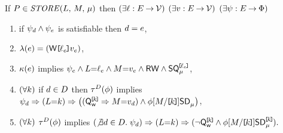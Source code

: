 \noindent
If $\aPS \in \sSTORE[\amode]{\cExp}{\aExp}$ then
$(\exists\cVal:\aEvs\fun\Val)$
$(\exists\aVal:\aEvs\fun\Val)$
$(\exists\bForm:\aEvs\fun\Formulae)$
\begin{enumerate}
\item if $\bForm_\bEv\land\bForm_\aEv$ is satisfiable then $\bEv=\aEv$,
\item $\labelingAct(\aEv) = \DWREFP{\cVal_\aEv}{\aVal_\aEv}$,
\item 
  $\labelingForm(\aEv)$ implies
  \begin{math}
    \bForm_\aEv
    \land \cExp{=}\cVal_\aEv
    \land \aExp{=}\aVal_\aEv
    \land \RW
    \land \QS{\REF{\cVal_\aEv}}{\amode}
  \end{math},
\item
  \begin{math}
    (\forall\dVal)
  \end{math}
  if
  $\bEv\in\bEvs$
  then
  $\aTr[\bEvs](\aForm)$ implies 
  \begin{math}
    \bForm_\bEv
    \limplies (\cExp{=}\dVal)
    \limplies \PBRbig{
      (\QwREF{\dVal} \limplies \aExp{=}\aVal_\bEv)
      \land \aForm[\aExp/\REF{\dVal}] \DS{}{\amode}
    }
  \end{math},
\item %
  \begin{math}
    (\forall\dVal)
  \end{math}
  $\aTr[\bEvs](\aForm)$ implies 
  \begin{math}
    (\not\exists\bEv\in\bEvs.\; \bForm_\bEv)
    \limplies (\cExp{=}\dVal)
    \limplies \PBR{
      \lnot\QwREF{\dVal}
      \land \aForm[\aExp/\REF{\dVal}] \DS{\REF{\dVal}}{\amode}
    }.
  \end{math}
\end{enumerate}
